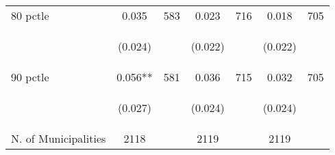 \begin{tabular}{lcccccc}
80 pctle   &  0.035   &  583  &   0.023  &  716 &  0.018  &  705   \\

\vspace{4pt} &  \begin{footnotesize}(0.024)\end{footnotesize}   & &
			    \begin{footnotesize}(0.022)\end{footnotesize}   & &
			    \begin{footnotesize}(0.022)\end{footnotesize}   &
			     \\          

90 pctle   &  0.056**   &  581  &   0.036  &  715 &  0.032  &  705   \\

\vspace{4pt} &  \begin{footnotesize}(0.027)\end{footnotesize}   & &
			    \begin{footnotesize}(0.024)\end{footnotesize}   & &
			    \begin{footnotesize}(0.024)\end{footnotesize}   &
			     \\          


N. of Municipalities   &   2118   & &    2119 &    &  2119  &   \\
\hline	


\end{tabular}%
